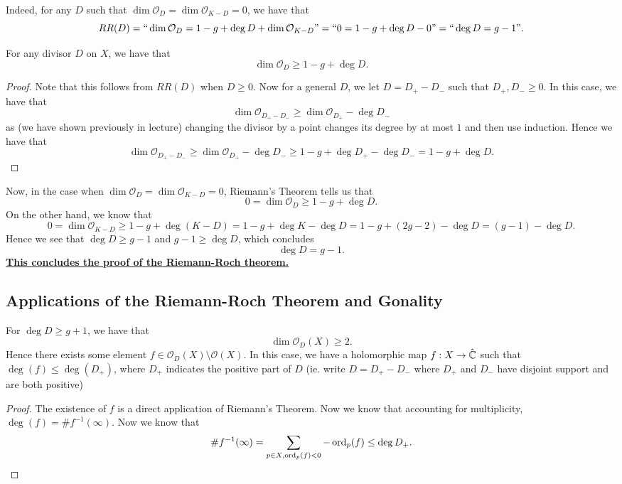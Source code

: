 \documentclass{article}
\begin{document}
{Indeed, for any $D$ such that $\dim \mathcal{O}_D = \dim \mathcal{O}_{K-D} = 0$, we have that
\[RR(D) = ``\dim \mathcal{O}_D = 1 - g + \deg D + \dim \mathcal{O}_{K-D}" = ``0 = 1- g + \deg D - 0" = ``\deg D = g - 1".\]

\begin{theorem}
    For any divisor $D$ on $X$, we have that
    \[\dim \mathcal{O}_D \geq 1 - g + \deg D.\]
\end{theorem}

\begin{proof}
    Note that this follows from $RR(D)$ when $D \geq 0$. Now for a general $D$, we let $D = D_+ - D_-$ such that $D_+, D_- \geq 0$. In this case, we have that
    \[\dim \mathcal{O}_{D_+ - D_-} \geq \dim \mathcal{O}_{D_+} - \deg D_-\]
    as (we have shown previously in lecture) changing the divisor by a point changes its degree by at most $1$ and then use induction. Hence we have that
    \[\dim \mathcal{O}_{D_+ - D_-} \geq \dim \mathcal{O}_{D_+} - \deg D_- \geq 1 - g + \deg D_+ - \deg D_- = 1 - g + \deg D.\]
\end{proof}

Now, in the case when $\dim \mathcal{O}_D = \dim \mathcal{O}_{K-D} = 0$, Riemann's Theorem tells us that
\[0 = \dim \mathcal{O}_D \geq 1 - g + \deg D.\]
On the other hand, we know that
\[0 = \dim \mathcal{O}_{K-D} \geq 1 - g + \deg(K-D) = 1 - g + \deg K - \deg D = 1 - g + (2g-2) - \deg D = (g - 1) - \deg D.\]
Hence we see that $\deg D \geq g-1$ and $g-1 \geq \deg D$, which concludes
\[\deg D = g-1.\]
\underline{\textbf{This concludes the proof of the Riemann-Roch theorem.}}

\subsection{Applications of the Riemann-Roch Theorem and Gonality}

\begin{theorem}
    For $\deg D \geq g + 1$, we have that
    \[\dim \mathcal{O}_D(X) \geq 2.\]
    Hence there exists some element $f \in \mathcal{O}_D(X) \setminus \mathcal{O}(X)$. In this case, we have a holomorphic map $f: X \to \hat{\mathbb{C}}$ such that $\deg(f) \leq \deg(D_+)$, where $D_+$ indicates the positive part of $D$ (ie. write $D = D_+ - D_-$ where $D_+$ and $D_-$ have disjoint support and are both positive)
\end{theorem}

\begin{proof}
    The existence of $f$ is a direct application of Riemann's Theorem. Now we know that accounting for multiplicity, $\deg(f) = \# f^{-1}(\infty)$. Now we know that
    \[\# f^{-1}(\infty) = \sum_{p \in X, \operatorname{ord}_p(f) < 0} -\operatorname{ord}_p(f) \leq \deg D_+.\]
\end{proof}

}
\end{document}
